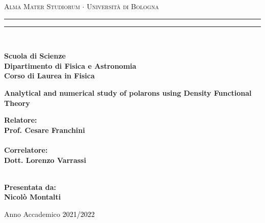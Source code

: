 \begin{titlepage}


    \begin{center}
        {{\Large{\textsc{Alma Mater Studiorum $\cdot$ Universit\`a di Bologna}}}}
        \rule[0.1cm]{15.8cm}{0.1mm}
        \rule[0.5cm]{15.8cm}{0.6mm}
        \\\vspace{3mm}

        {\small{\bf Scuola di Scienze \\
                Dipartimento di Fisica e Astronomia\\
                Corso di Laurea in Fisica}}

    \end{center}

    \vspace{23mm}
    \centering
    \begin{center}%
        {\LARGE{\bf Analytical and numerical study of polarons using Density Functional Theory}}\\
    \end{center}

    \vspace{50mm} \par \noindent

    \begin{minipage}[t]{0.47\textwidth}
        {\large{\bf Relatore:
                \vspace{2mm}\\
                Prof. Cesare Franchini}} \\\\
        \bf Correlatore:
        \vspace{2mm}\\
        Dott. Lorenzo Varrassi\\\\
    \end{minipage}
    \hfill
    \begin{minipage}[t]{0.47\textwidth}\raggedleft
        {\large{\bf Presentata da:
                \\
                \vspace{2mm}
                Nicolò Montalti}}
    \end{minipage}

    \vspace{40mm}

    \begin{center}
        Anno Accademico \textcolor{black}{2021/2022}
    \end{center}

\end{titlepage}
\restoregeometry